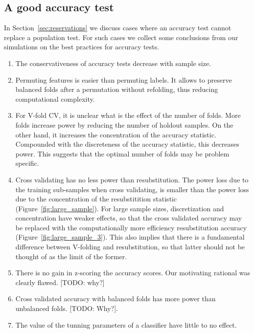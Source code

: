 \documentclass[12pt,a4paper]{article}
\theoremstyle{definition}
\begin{document}
\subsection{A good accuracy test}
In Section~\ref{sec:reservations} we discuss cases where an accuracy test cannot replace a population test.
For such cases we collect some conclusions from our simulations on the best practices for accuracy tests.
\begin{enumerate}
\item The conservativeness of accuracy tests decrease with sample size. 

\item Permuting features is easier than permuting labels. 
It allows to preserve balanced folds after a permutation without refolding, thus reducing computational complexity.

\item For V-fold CV, it is unclear what is the effect of the number of folds. 
More folds increase power by reducing the number of holdout samples. 
On the other hand, it increases the concentration of the accuracy statistic. Compounded with the discreteness of the accuracy statistic, this decreases power. 
This suggests that the optimal number of folds may be problem specific. 

\item Cross validating has no less power than resubstitution. 
The power loss due to the training sub-samples when cross validating, is smaller than the power loss due to the concentration of the resubstitition statistic (Figure~\ref{fig:large_sample}). 
For large sample sizes, discretization and concentration have weaker effects, so that the cross validated accuracy may be replaced with the computationally more efficiency resubstitution accuracy (Figure~\ref{fig:large_sample_3}).
This also implies that there is a fundamental difference between V-folding and resubstitution, so that latter should not be thought of as the limit of the former. 

\item There is no gain in z-scoring the accuracy scores. Our motivating rational was clearly flawed. [TODO: why?]

\item Cross validated accuracy with balanced folds has more power than unbalanced folds. 
[TODO: Why?]. 

\item The value of the tunning parameters of a classifier have little to no effect. 
\end{enumerate}
\end{document}
